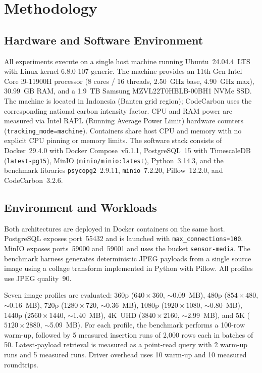 \documentclass[conference]{IEEEtran}
\begin{document}
\section{Methodology}
\label{sec:methodology}

\subsection{Hardware and Software Environment}
All experiments execute on a single host machine running Ubuntu~24.04.4~LTS with Linux kernel 6.8.0-107-generic. The machine provides an 11th Gen Intel Core i9-11900H processor (8 cores / 16 threads, 2.50~GHz base, 4.90~GHz max), 30.99~GB RAM, and a 1.9~TB Samsung MZVL22T0HBLB-00BH1 NVMe SSD. The machine is located in Indonesia (Banten grid region); CodeCarbon uses the corresponding national carbon intensity factor. CPU and RAM power are measured via Intel RAPL (Running Average Power Limit) hardware counters (\texttt{tracking\_mode=machine}). Containers share host CPU and memory with no explicit CPU pinning or memory limits. The software stack consists of Docker~29.4.0 with Docker Compose~v5.1.1, PostgreSQL~15 with TimescaleDB (\texttt{latest-pg15}), MinIO (\texttt{minio/minio:latest}), Python~3.14.3, and the benchmark libraries \texttt{psycopg2}~2.9.11, \texttt{minio}~7.2.20, Pillow~12.2.0, and CodeCarbon~3.2.6.

\subsection{Environment and Workloads}
Both architectures are deployed in Docker containers on the same host. PostgreSQL exposes port~55432 and is launched with \texttt{max\_connections=100}. MinIO exposes ports~59000 and~59001 and uses the bucket \texttt{sensor-media}. The benchmark harness generates deterministic JPEG payloads from a single source image using a collage transform implemented in Python with Pillow. All profiles use JPEG quality~90.

Seven image profiles are evaluated: 360p ($640{\times}360$, $\sim$0.09~MB), 480p ($854{\times}480$, $\sim$0.16~MB), 720p ($1280{\times}720$, $\sim$0.36~MB), 1080p ($1920{\times}1080$, $\sim$0.80~MB), 1440p ($2560{\times}1440$, $\sim$1.40~MB), 4K~UHD ($3840{\times}2160$, $\sim$2.99~MB), and 5K ($5120{\times}2880$, $\sim$5.09~MB). For each profile, the benchmark performs a 100-row warm-up, followed by 5 measured insertion runs of 2,000 rows each in batches of 50. Latest-payload retrieval is measured as a point-read query with 2 warm-up runs and 5 measured runs. Driver overhead uses 10 warm-up and 10 measured roundtrips.
\end{document}
